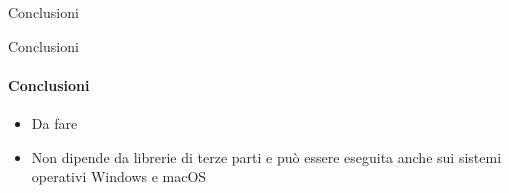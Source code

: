\documentclass[
 ]{beamer}
\begin{document}
\begin{frame}[c]
  \centering
  \bigskip \bigskip    
  \Huge Conclusioni
\end{frame}

\begin{frame}{Conclusioni}
    \framesubtitle{Conclusioni}
    \smallskip
    \begin{itemize} [<+->]
        \setlength\itemsep{3em}
        \item \large Da fare
        \item \large Non dipende da librerie di terze parti e può essere eseguita anche sui sistemi operativi Windows e macOS
    \end{itemize}     
\end{frame}
\end{document}
